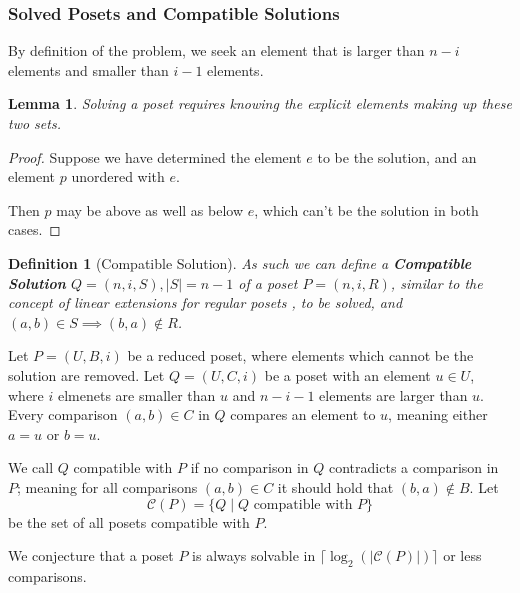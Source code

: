 \documentclass[10pt,journal,compsoc]{IEEEtran}
\newtheorem{lemma}{Lemma}
\newtheorem{definition}{Definition}
\begin{document}

\subsubsection{Solved Posets and Compatible Solutions}
By definition of the problem, we seek an
element that is larger than $n-i$ elements and smaller than
$i-1$ elements. 

\begin{lemma}
  Solving a poset requires knowing the explicit elements
  making up these two sets.
\end{lemma}
\begin{proof}
  Suppose we have determined the element $e$ to be the 
  solution, and an element $p$ unordered with $e$.

  Then $p$ may be above as well as below $e$, which
  can't be the solution in both cases.
\end{proof}

\begin{definition}[Compatible Solution]
  As such we can define a \textbf{Compatible Solution} $Q = (n, i, S), |S|=n-1$ of a poset $P=(n, i, R)$,
  similar to the concept of linear extensions for
  regular posets %
  , to be solved, and $(a, b)\in S\implies (b, a)\notin R$.
\end{definition}

Let $P = (U, B, i)$ be a reduced poset, where elements which cannot be the solution are removed.
Let $Q = (U, C, i)$ be a poset with an element $u \in U$, where $i$ elmenets are smaller than $u$ and $n-i-1$ elements are larger than $u$.
Every comparison $(a,b) \in C$ in $Q$ compares an element to $u$, meaning either $a = u$ or $b = u$.

We call $Q$ compatible with $P$ if no comparison in $Q$ contradicts a comparison in $P$; meaning for all comparisons $(a,b) \in C$ it should hold that $(b,a) \not\in B$.
Let $$\mathcal{C}(P) = \{Q \mid Q \text{ compatible with } P\}$$ be the set of all posets compatible with $P$.

We conjecture that a poset $P$ is always solvable in $\lceil\log_2(|\mathcal{C}(P)|)\rceil$ or less comparisons.
\end{document}
